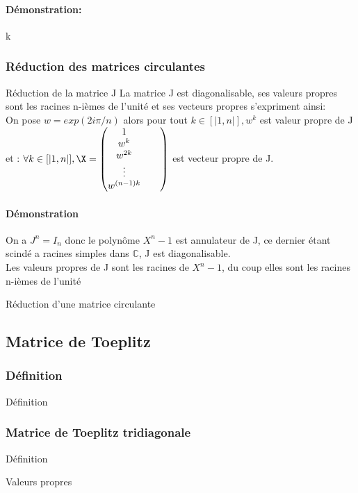 \documentclass{book}
\begin{document}
\paragraph{Démonstration:}
k
\subsubsection{Réduction des matrices circulantes}
\begin{Propriété}[]{Réduction de la matrice J}{}
La matrice J est diagonalisable, ses valeurs propres sont les racines n-ièmes de l'unité et ses vecteurs propres s'expriment ainsi:
\\ On pose \(w=exp(2i\pi/n)\) alors pour tout \(k \in [|1,n|], w^k\) est valeur propre de J et :
\(\forall k\in [|1,n|],\X=\begin{pmatrix}
    1&&
    \\w^k&&
    \\w^{2k}&&
    \\\vdots&&
    \\w^{(n-1)k}&&
\end{pmatrix}\)
est vecteur propre de J.
\end{Propriété}
\paragraph{Démonstration}
On a \(J^n=I_{n}\) donc le polynôme \(X^n-1\) est annulateur de J, ce dernier étant scindé a racines simples dans \(\mathbb{C}\), J est diagonalisable.
\\ Les valeurs propres de J sont les racines de \(X^n-1\), du coup elles sont les racines n-ièmes de l'unité 
\begin{Propriété}[]{Réduction d'une matrice circulante}{}
    
\end{Propriété}
\subsection{Matrice de Toeplitz}
\subsubsection{Définition}
\begin{Définition}[]{Définition}{}

\end{Définition}
\subsubsection{Matrice de Toeplitz tridiagonale}
\begin{Définition}[]{Définition}{}

\end{Définition}
\begin{Propriété}[]{Valeurs propres}{}
    
\end{Propriété}
\end{document}
